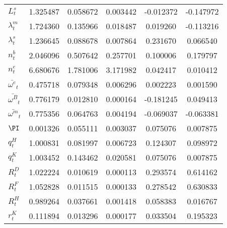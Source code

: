 \begin{center}
\begin{longtable}{lccccc}
$ L^s_t                     $	 & 	        1.325487	 & 	        0.058672	 & 	        0.003442	 & 	       -0.012372	 & 	       -0.147972 \\ 
$ \lambda^m_t               $	 & 	        1.724360	 & 	        0.135966	 & 	        0.018487	 & 	        0.019260	 & 	       -0.113216 \\ 
$ \lambda^s_t               $	 & 	        1.236645	 & 	        0.088678	 & 	        0.007864	 & 	        0.231670	 & 	        0.066540 \\ 
$ n^b_t                     $	 & 	        2.046096	 & 	        0.507642	 & 	        0.257701	 & 	        0.100006	 & 	        0.179797 \\ 
$ n^e_t                     $	 & 	        6.680676	 & 	        1.781006	 & 	        3.171982	 & 	        0.042417	 & 	        0.010412 \\ 
$ \bar{\omega^e}_t          $	 & 	        0.475718	 & 	        0.079348	 & 	        0.006296	 & 	        0.002223	 & 	        0.001590 \\ 
$ \bar{\omega^B}_t          $	 & 	        0.776179	 & 	        0.012810	 & 	        0.000164	 & 	       -0.181245	 & 	        0.049413 \\ 
$ \bar{\omega^m}_t          $	 & 	        0.775356	 & 	        0.064763	 & 	        0.004194	 & 	       -0.069037	 & 	       -0.063381 \\ 
$ \PI                       $	 & 	        0.001326	 & 	        0.055111	 & 	        0.003037	 & 	        0.075076	 & 	        0.007875 \\ 
$ q^H_t                     $	 & 	        1.000831	 & 	        0.081997	 & 	        0.006723	 & 	        0.124307	 & 	        0.098972 \\ 
$  q^K_t                    $	 & 	        1.003452	 & 	        0.143462	 & 	        0.020581	 & 	        0.075076	 & 	        0.007875 \\ 
$  R^D_t                    $	 & 	        1.022224	 & 	        0.010619	 & 	        0.000113	 & 	        0.293574	 & 	        0.614162 \\ 
$ R^F_t                     $	 & 	        1.052828	 & 	        0.011515	 & 	        0.000133	 & 	        0.278542	 & 	        0.630833 \\ 
$   R^H_t                   $	 & 	        0.989264	 & 	        0.037661	 & 	        0.001418	 & 	        0.058383	 & 	        0.016767 \\ 
$ r^K_t                     $	 & 	        0.111894	 & 	        0.013296	 & 	        0.000177	 & 	        0.033504	 & 	        0.195323 \\ 

\end{longtable}
\end{center}
